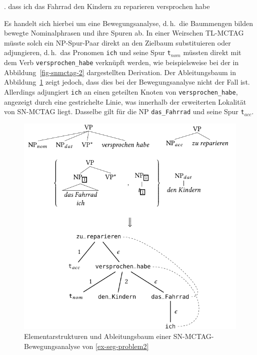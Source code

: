 \ex. dass ich das Fahrrad den Kindern zu reparieren versprochen habe \label{ex-seg-problem2}

Es handelt sich hierbei um eine Bewegungsanalyse, d.\,h.\ die Baummengen bilden bewegte Nominalphrasen und ihre Spuren ab. In einer Weirschen TL-MCTAG müsste solch ein NP-Spur-Paar direkt an den Zielbaum substituieren oder adjungieren, d.\,h.\ das Pronomen {\tt ich} und seine Spur {\tt t}$_{nom}$ müssten direkt mit dem Verb {\tt versprochen\_habe} verknüpft werden, wie beispielsweise bei der in Abbildung~\ref{fig-snmctag-2} dargestellten Derivation. Der Ableitungsbaum in Abbildung~\ref{fig-snmctag-1} zeigt jedoch, dass dies bei der Bewegungsanalyse nicht der Fall ist. Allerdings adjungiert {\tt ich} an einen geteilten Knoten von {\tt versprochen\_habe}, angezeigt durch eine gestrichelte Linie, was innerhalb der erweiterten Lokalität von SN-MCTAG liegt. Dasselbe gilt für die NP {\tt das\_Fahrrad} und seine Spur {\tt t}$_{acc}$.     

\begin{figure}[t]
\centering
\includegraphics{graphics/abb615.pdf}
\caption{Elementarstrukturen und Ableitungsbaum einer SN-MCTAG-Bewegungs\-analyse von \ref{ex-seg-problem2}\label{fig-snmctag-1}}
\end{figure}

